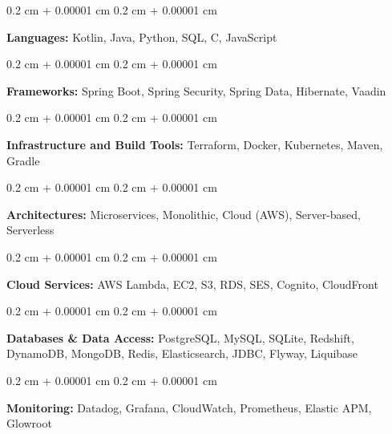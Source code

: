 \documentclass[10pt, letterpaper]{article}
\newenvironment{onecolentry}{
    \begin{adjustwidth}{
        0.2 cm + 0.00001 cm
    }{
        0.2 cm + 0.00001 cm
    }
}{
    \end{adjustwidth}
} %
\begin{document}
        \vspace{0.125 cm}

        \begin{onecolentry}
            \textbf{Languages:} Kotlin, Java, Python, SQL, C, JavaScript
        \end{onecolentry}

        \vspace{0.125 cm}

        \begin{onecolentry}
            \textbf{Frameworks:} Spring Boot, Spring Security, Spring Data, Hibernate, Vaadin
        \end{onecolentry}

        \vspace{0.125 cm}

        \begin{onecolentry}
            \textbf{Infrastructure and Build Tools:} Terraform, Docker, Kubernetes, Maven, Gradle
        \end{onecolentry}

        \vspace{0.125 cm}

        \begin{onecolentry}
            \textbf{Architectures:} Microservices, Monolithic, Cloud (AWS), Server-based, Serverless
        \end{onecolentry}

        \vspace{0.125 cm}

        \begin{onecolentry}
            \textbf{Cloud Services:} AWS Lambda, EC2, S3, RDS, SES, Cognito, CloudFront
        \end{onecolentry}

        \vspace{0.125 cm}

        \begin{onecolentry}
            \textbf{Databases \& Data Access:} PostgreSQL, MySQL, SQLite, Redshift, DynamoDB, MongoDB, Redis, Elasticsearch, JDBC, Flyway, Liquibase
        \end{onecolentry}

        \vspace{0.125 cm}

        \begin{onecolentry}
           \textbf{Monitoring:} Datadog, Grafana, CloudWatch, Prometheus, Elastic APM, Glowroot
        \end{onecolentry}
\end{document}
